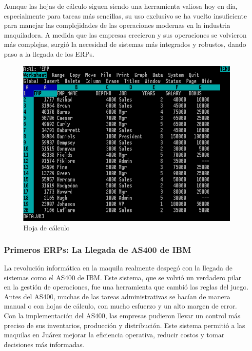 \documentclass[
  letterpaper,
]{book}
\begin{document}
Aunque las hojas de cálculo siguen siendo una herramienta valiosa hoy en
día, especialmente para tareas más sencillas, su uso exclusivo se ha
vuelto insuficiente para manejar las complejidades de las operaciones
modernas en la industria maquiladora. A medida que las empresas
crecieron y sus operaciones se volvieron más complejas, surgió la
necesidad de sistemas más integrados y robustos, dando paso a la llegada
de los ERPs.

\begin{figure}[H]

{\centering \includegraphics{Img/Lotus.png}

}

\caption{Hoja de cálculo}

\end{figure}%

\subsubsection{Primeros ERPs: La Llegada de AS400 de
IBM}\label{primeros-erps-la-llegada-de-as400-de-ibm}

La revolución informática en la maquila realmente despegó con la llegada
de sistemas como el AS400 de IBM. Este sistema, que se volvió un
verdadero pilar en la gestión de operaciones, fue una herramienta que
cambió las reglas del juego. Antes del AS400, muchas de las tareas
administrativas se hacían de manera manual o con hojas de cálculo, con
mucho esfuerzo y un alto margen de error. Con la implementación del
AS400, las empresas pudieron llevar un control más preciso de sus
inventarios, producción y distribución. Este sistema permitió a las
maquilas en Juárez mejorar la eficiencia operativa, reducir costos y
tomar decisiones más informadas.
\end{document}
